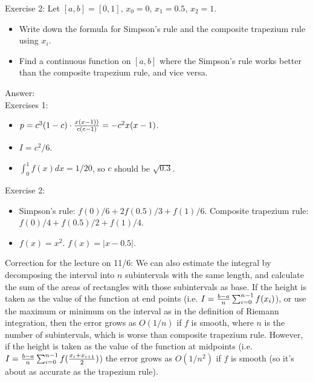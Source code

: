\documentclass{article} %
\theoremstyle{break}
\begin{document}
      Exercise 2: Let $[a, b]=[0, 1]$, $x_0=0$, $x_1=0.5$, $x_2=1$.
      \begin{itemize}
      \item Write down the formula for Simpson's rule and the composite trapezium rule using $x_i$.
      \item Find a continuous function on $[a, b]$ where the Simpson's rule works better than the composite trapezium rule, and vice versa.
      \end{itemize}
      
       Answer:\\

       Exercises 1:\\
       \begin{itemize}
       \item $p=c^3(1-c)\cdot {x(x-1))\over c(c-1)}=-c^2x(x-1)$.
       \item $I=c^2/6$. 
       \item $\int_0^1f(x)dx=1/20$, so $c$ should be $\sqrt{0.3}$.
       \end{itemize}
      
       Exercise 2:\\
       \begin{itemize}
       \item Simpson's rule: $f(0)/6+2f(0.5)/3+f(1)/6$. Composite trapezium rule: $f(0)/4+f(0.5)/2+f(1)/4$.
       \item $f(x)=x^2$. $f(x)=|x-0.5|$. 
       \end{itemize}

       
       Correction for the lecture on 11/6: We can also estimate the integral by decomposing the interval into $n$ subintervals with the same length, and calculate the sum of the areas of rectangles with those subintervals as base. If the height is taken as the value of the function at end points (i.e. $I={b-a\over n}\sum_{i=0}^{n-1}f(x_i)$), or use the maximum or minimum on the interval as in the definition of Riemann integration, then the error grows as $O(1/n)$ if $f$ is smooth, where $n$ is the number of subintervals, which is worse than composite trapezium rule. However, if the height is taken as the value of the function at midpoints (i.e. $I={b-a\over n}\sum_{i=0}^{n-1}f({x_i+x_{i+1}\over 2})$) the error grows as $O(1/n^2)$ if $f$ is smooth (so it's about as accurate as the trapezium rule).
       
\end{document}

